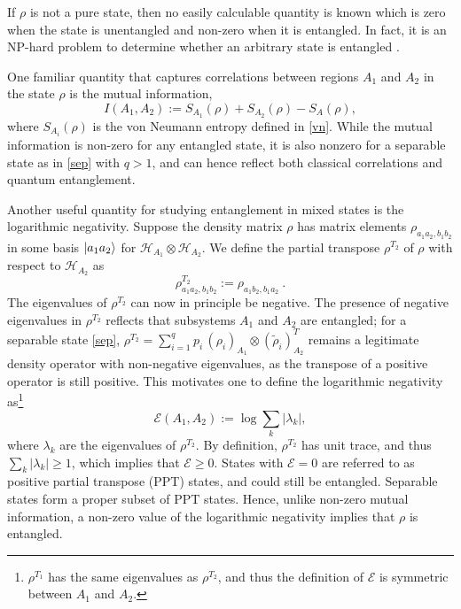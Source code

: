 \documentclass[a4paper,11pt]{article}
\newcommand{\be}{\begin{equation}}
\newcommand{\ee}{\end{equation}}
\newcommand\lam{\lambda}
\newcommand\sE{{\ensuremath{{\mathcal E}}}}
\newcommand\sH{{\ensuremath{{\mathcal H}}}}
\newcommand{\Tr}{\text{Tr}}
\begin{document}
If $\rho$ is not a pure state, then no easily calculable quantity is known which is zero when the state is unentangled and non-zero when it is entangled. In fact, it is an NP-hard problem to determine whether an arbitrary state is entangled \cite{gurvits2004classical}. 

One familiar quantity that captures correlations between regions $A_1$ and $A_2$ in the state $\rho$ is the mutual information, 
\be 
I(A_1, A_2) := S_{A_1}(\rho) +S_{A_2}(\rho) - S_{A}(\rho), \label{mut} 
\ee 
where $S_{A_i}(\rho)$ is the von Neumann entropy defined in \eqref{vn}. While the mutual information is non-zero for any entangled state, it is also nonzero for a separable state as in \eqref{sep} with $q> 1$, and can hence reflect both classical correlations and quantum entanglement. 

Another useful quantity for studying entanglement in mixed states is the logarithmic negativity. Suppose the density matrix $\rho$ has matrix elements 
$\rho_{a_1 a_2, b_1 b_2}$ in some basis $\ket{a_1 a_2}$ for $\sH_{A_1}\otimes \sH_{A_2}$. We define the partial transpose $\rho^{T_2}$ of $\rho$ with respect to $\sH_{A_2}$ as 
\be 
\rho^{T_2}_{a_1 a_2, b_1 b_2} := \rho_{a_1 b_2, b_1 a_2} \ . \label{pt}
\ee
The eigenvalues of $\rho^{T_2}$ can now in principle be negative. The presence of negative eigenvalues in $\rho^{T_2}$ reflects that subsystems $A_1$ and $A_2$ are entangled; for a separable state \eqref{sep}, $\rho^{T_2} = \sum_{i=1}^q p_i \, (\rho_i)_{A_1}\otimes (\tilde{\rho}_i)^{T}_{A_2}$ remains a legitimate density operator with non-negative eigenvalues, as the transpose of a positive operator is still positive. 
This motivates one to define the logarithmic negativity as\footnote{$\rho^{T_1}$ has the same eigenvalues as $\rho^{T_2}$, and thus the definition of $\sE$ is symmetric between $A_1$ and $A_2$.} \cite{1996PhLA..223....1H,1998PhRvA..58..883Z, 1996PhRvL..77.1413P, eisert1999comparison, 2000PhRvL..84.2726S, vidal2002computable, plenio2005logarithmic}
\be
\sE (A_1, A_2) %
 := \log \sum_{k} |\lam_k|,
\ee
where $\lam_k$ are the eigenvalues of $\rho^{T_2}$. By definition, $\rho^{T_2}$ has unit trace, and thus $\sum_{k} |\lam_k| \geq 1$, 
which implies that $\sE \geq 0$. States with $\sE=0$ are referred to as positive partial transpose (PPT) states, and could still be entangled. Separable states form a proper subset of PPT states. Hence, unlike non-zero mutual information, a non-zero value of the logarithmic negativity implies that $\rho$ is entangled. 
\end{document}
